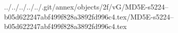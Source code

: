 ../../../../../.git/annex/objects/2f/vG/MD5E-s5224--b05d622247abf499f828a3892fd996c4.tex/MD5E-s5224--b05d622247abf499f828a3892fd996c4.tex